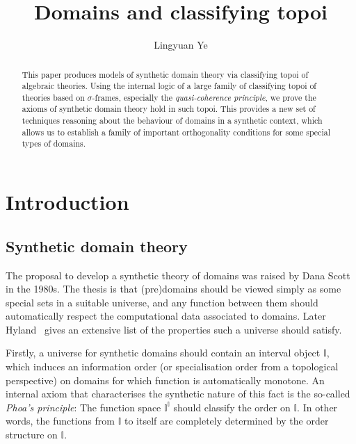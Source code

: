 \documentclass[12pt]{amsart}
\title{Domains and classifying topoi}
\author{Lingyuan Ye}
\theoremstyle{definition}
\newcommand{\mbb}[1]{\mathbb{#1}}
\newcommand{\I}{\mbb I}
\begin{document}
%

%
%

%
%
\begin{abstract}
  This paper produces models of synthetic domain theory via classifying topoi of algebraic theories. Using the internal logic of a large family of classifying topoi of theories based on $\sigma$-frames, especially the \emph{quasi-coherence principle}, we prove the axioms of synthetic domain theory hold in such topoi. This provides a new set of techniques reasoning about the behaviour of domains in a synthetic context, which allows us to establish a family of important orthogonality conditions for some special types of domains.
\end{abstract}
%
\maketitle              %
%

\section{Introduction}\label{sec:intro}

\subsection{Synthetic domain theory}\label{subsec:sdt}

The proposal to develop a synthetic theory of domains was raised by Dana Scott in the 1980s. The thesis is that (pre)domains should be viewed simply as some special sets in a suitable universe, and any function between them should automatically respect the computational data associated to domains. Later Hyland~\cite{hyland1990first} gives an extensive list of the properties such a universe should satisfy.

Firstly, a universe for synthetic domains should contain an interval object $\I$, which induces an information order (or specialisation order from a topological perspective) on domains for which function is automatically monotone. An internal axiom that characterises the synthetic nature of this fact is the so-called \emph{Phoa's principle}: The function space $\I^\I$ should classify the order on $\I$. In other words, the functions from $\I$ to itself are completely determined by the order structure on $\I$. 
\end{document}
